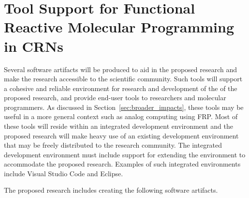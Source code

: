 
\section{Tool Support for Functional Reactive Molecular Programming in CRNs}
\label{sec:software_support}

Several software artifacts will be produced to aid in the proposed research and make the research accessible to the scientific community.  Such tools will support a cohesive and reliable environment for research and development of the of the proposed research, and provide end-user tools to researchers and molecular programmers.  As discussed in Section~\ref{sec:broader_impacts}, these tools may be useful in a more general context such as analog computing using FRP.
Most of these tools will reside within an integrated development environment and the proposed research will make heavy use of an existing development environment that may be freely distributed to the research community.
The integrated development environment must include support for extending the environment to accommodate the proposed research.
Examples of such integrated environments include Visual Studio Code and Eclipse.

The proposed research includes creating the following software artifacts.

